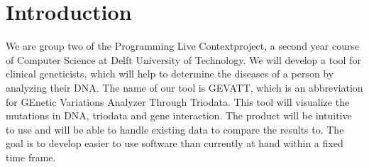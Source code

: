 \section{Introduction}
	We are group two of the Programming Live Contextproject, a second year course of Computer Science at Delft University of Technology. We will develop a tool for clinical geneticists, which will help to determine the diseases of a person by analyzing their DNA. The name of our tool is GEVATT, which is an abbreviation for GEnetic Variations Analyzer Through Triodata. This tool will visualize the mutations in DNA, triodata and gene interaction. The product will be intuitive to use and will be able to handle existing data to compare the results to. The goal is to develop easier to use software than currently at hand within a fixed time frame.